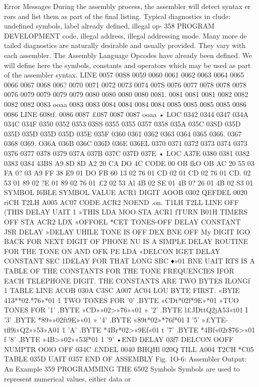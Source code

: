 \documentclass{book}
\begin{document}
{{{{{{{{{{{{{{{{{{{{{{{{{{{{{{{{{{{{{{{{{{{{{{{{{{{{{{{{{{{{{{{{{{{{{{{{{{{{{{{{{{{{{{{{{{{{{{{{{{{{{{{{{{{{{{{{{{{{{{{{{{{{{{{{{{{{{{{{{{{{Error Messages
During the assembly process, the assembler will detect syntax er
rors and list them as part of the final listing. Typical diagnostics in
clude: undefined symbols, label already defined, illegal op-
358
PROGRAM DEVELOPMENT
code, illegal address, illegal addressing mode. Many more de
tailed diagnostics are naturally desirable and usually provided.
They vary with each assembler.
The Assembly Language
Opcodes have already been defined. We will define here the
symbols, constants and operators which may be used as part of
the assembler syntax.
LINE
0057
00S8
0059
0060
0061
0062
0063
0064
0065
0066
0067
0068
006?
0070
0071
0072
0073
0074
007S
0076
0077
0078
0078
0078
0076
0079
0079
0079
0079
0080
0080
0080
0080
0081.
0081
0081
0081
0082
0082
0082
0082
0083
ooaa
0083
0083
0084
0084
0084
0084
0085
0085
0085
0085
0086
0086
LINE
608tf.
0086
0087
£087
0087
0087
ooaa
• LOC
0342
0344
0347
034A
034C
034F
0350
0352
0353
03SS
0355
0355
0357
0358
035A
035C
03SD
035D
035D
035D
035D
035D
035E
035F
0360
0361
0362
0363
0364
0365
0366.
0367
0368
0369.
O36A
036B
036C
036D
036E
036EL
0370
0371
0372
0373
0374
0373
0376
0377
0378
0379
037A
037B
037C
037D
037E
• LOC
A37E
0380
0381
0382
0383
0384
43BS
A9
8D
8D
A2
20
CA
DO
4C
CODE
00
OB fkO
OB AC
20
55 03
FA
0? 03
A9 FF
38
E9 01
DO FB
60
13
02
76
01
CD
02
01
CD
02
76
01
CD.
02
53
01
89
02
?E
01
89
02
76
01
£2
02
53
Al
4B
02
SE
01
4B
0?
26
01
4B
02
S3
01
SYMBOL I6BLE
SYMBOL VALUE
ACR1
DIGIT
AOOB
0302
QEFDEL 0020
riCH
T2LH
A005
AC07
CODE
ACR2
NOEND
.on.
T1LH
T2LL
LINE
OFF
(THIS
DELAY
UAIT
1
»THIS
LDA MOO
STA ACR1 fTURN B01H TIMERS OFF
STA ACR2
LDX «OFFOEL *CET TONES-OFF DELAY CONSTANT
JSR DELAY »DELAY UHILE TONE IS OFF
DEX
BNE OFF
My DIGIT IGO BACK FOR NEXT DIGIT OF PHONE NU
IS A SIMPLE DELAY ROUTINE FOR THE TONE ON AND OFK PE
LDA «DELCON IGET DELAY CONSTANT
SEC 1DELAY FOR THAT LONG
SBC ♦»01
BNE UAIT
RTS
IS A TABLE OF THE CONSTANTS FOR THE TONE FREQUENCIES
IFOR EACH TELEPHONE DIGIT. THE CONSTANTS ARE TWO BYTES
ILONGf
1
TABLE
LINE
ACOB
030A
C3SC
A007
AC04
LOU BYTE FIRST.
«BYIE 413**02.*76»*01 1 TWO TONES FOR '0'
.BYTE «CDt*02f*9E»*01 »TUO TONES FOR '1'
.BYTE »CD»»02>»76»«01 » '2'
.BYTE l£JDttQ2jA53«t01 I '3'
.BYTE *89»»02ft9E»«01 » '4'
.BYTE «89t*02»*76f*01 I '5'
»£YTE-tfl9i»Q2»»53»A01 1 'A'
.BYTE *4Br*02>«9Ef«01 t '7'
.BYTE *4Bf«02r\$76>«01 f '8'
.BYTE »4B>»02»«53f*01 1 '9'
•END
DELAY 03f7 DELCON OOFF
NUMPTR OOlO OFF 034C
£NDEL 0040 BHQHl 020Q
TILL A004 T2CH *C05
TABLE 035D UAIT 0357
END OF ASSEMBLY
Fig. 1O-6: Assembler Output: An Example
359
PROGRAMMING THE 6502
Symbols
Symbols are used to represent numerical values, either data or
}}}}}}}}}}}}}}}}}}}}}}}}}}}}}}}}}}}}}}}}}}}}}}}}}}}}}}}}}}}}}}}}}}}}}}}}}}}}}}}}}}}}}}}}}}}}}}}}}}}}}}}}}}}}}}}}}}}}}}}}}}}}}}}}}}}}}}}}}}}}
\end{document}
